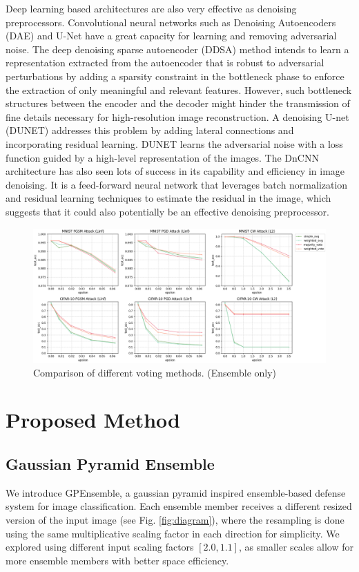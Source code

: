 \documentclass[10pt,journal,compsoc]{IEEEtran}
\begin{document}
Deep learning based architectures are also very effective as denoising preprocessors. Convolutional neural networks such as Denoising Autoencoders (DAE) and U-Net have a great capacity for learning and removing adversarial noise. The deep denoising sparse autoencoder (DDSA) \cite{cite13} method intends to learn a representation extracted from the autoencoder that is robust to adversarial perturbations by adding a sparsity constraint in the bottleneck phase to enforce the extraction of only meaningful and relevant features. However, such bottleneck structures between the encoder and the decoder might hinder the transmission of fine details necessary for high-resolution image reconstruction. A denoising U-net (DUNET) \cite{cite14} addresses this problem by adding lateral connections and incorporating residual learning. DUNET learns the adversarial noise with a loss function guided by a high-level representation of the images. The DnCNN \cite{cite15} architecture has also seen lots of success in its capability and efficiency in image denoising. It is a feed-forward neural network that leverages batch normalization and residual learning techniques to estimate the residual in the image, which suggests that it could also potentially be an effective denoising preprocessor.

\begin{figure}[!h]
\centering
    \includegraphics[width=1.8\columnwidth]{images/voting_methods.png}
    \caption{Comparison of different voting methods. (Ensemble only)}
    \label{fig:voting}
\end{figure}

\section{Proposed Method} %
\subsection{Gaussian Pyramid Ensemble}
We introduce GPEnsemble, a gaussian pyramid inspired ensemble-based defense system for image classification. Each ensemble member receives a different resized version of the input image (see Fig. \ref{fig:diagram}), where the resampling is done using the same multiplicative scaling factor in each direction for simplicity. We explored using different input scaling factors $[2.0, 1.1]$, as smaller scales allow for more ensemble members with better space efficiency.
\end{document}
